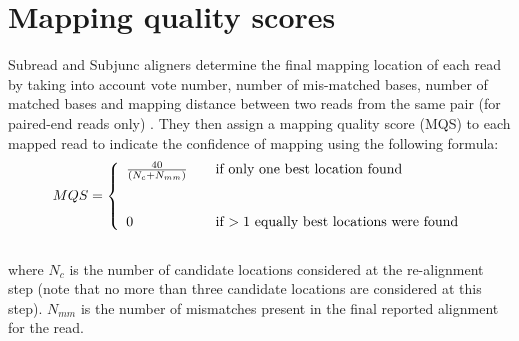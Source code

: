 \documentclass[12pt]{report}
\newcommand{\Subread}{\textsf{Subread}}
\newcommand{\Subjunc}{\textsf{Subjunc}}
\begin{document}
\section{Mapping quality scores}

{\Subread} and {\Subjunc} aligners determine the final mapping location of each read by taking into account vote number, number of mis-matched bases, number of matched bases and mapping distance between two reads from the same pair (for paired-end reads only) .
They then assign a mapping quality score (MQS) to each mapped read to indicate the confidence of mapping using the following formula:\\

\[ MQS = \left\{
\begin{array}{l l}
\frac{40}{(N_c + N_{mm})} & \quad \text{if only one best location found}\\
& \\
& \\
0 & \quad \text{if $>1$ equally best locations were found}\\
\end{array} \right.\] \\

\noindent where $N_c$ is the number of candidate locations considered at the re-alignment step (note that no more than three candidate locations are considered at this step).
$N_{mm}$ is the number of mismatches present in the final reported alignment for the read.



\end{document}
